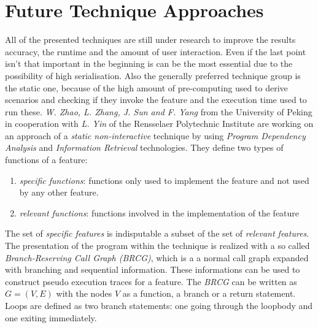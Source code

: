 \section{Future Technique Approaches}
All of the presented techniques are still under research to improve the results accuracy, the runtime and the amount of user interaction. Even if the last point isn't that important in the beginning is can be the most essential due to the possibility of high serialisation. Also the generally preferred technique group is the static one, because of the high amount of pre-computing used to derive scenarios and checking if they invoke the feature and the execution time used to run these.\newline
\textit{W. Zhao, L. Zhang, J. Sun and F. Yang} from the University of Peking in cooperation with \textit{L. Yin} of the Rensselaer Polytechnic Institute are working on an approach of a \textit{static non-interactive} technique by using \textit{Program Dependency Analysis} and \textit{Information Retrieval} technologies.\newline
They define two types of functions of a feature:
\begin{enumerate}
	\item \textit{specific functions}:
	functions only used to implement the feature and not used by any other feature.
	\item \textit{relevant functions}:
	functions involved in the implementation of the feature
\end{enumerate}
The set of \textit{specific features} is indisputable a subset of the set of \textit{ relevant features}.
The presentation of the program within the technique is realized with a so called \textit{Branch-Reserving Call Graph (BRCG)}, which is a a normal call graph expanded with branching and sequential information. These informations can be used to construct pseudo execution traces for a feature. The \textit{BRCG} can be written as $G=(V,E)$ with the nodes $V$ as a function, a branch or a return statement. Loops are defined as two branch statements: one going through the loopbody and one exiting immediately. 


